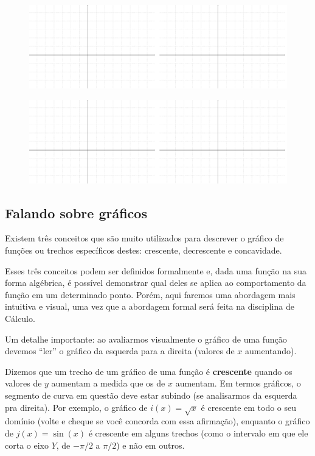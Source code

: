 \documentclass[main.tex]{subfiles}
\begin{document}
\begin{figure}[h]
\centering
\includegraphics[width=\textwidth]{./img/c7q1.png}
\end{figure}

\begin{figure}[h]
\centering
\includegraphics[width=\textwidth]{./img/c7q1.png}
\end{figure}

\newpage

\subsection*{Falando sobre gráficos}

Existem três conceitos que são muito utilizados para descrever o gráfico de funções ou trechos específicos destes: crescente, decrescente e concavidade.

Esses três conceitos podem ser definidos formalmente e, dada uma função na sua forma algébrica, é possível demonstrar qual deles se aplica ao comportamento da função em um determinado ponto. Porém, aqui faremos uma abordagem mais intuitiva e visual, uma vez que a abordagem formal será feita na disciplina de Cálculo.

Um detalhe importante: ao avaliarmos visualmente o gráfico de uma função devemos ``ler'' o gráfico da esquerda para a direita (valores de $x$ aumentando).

Dizemos que um trecho de um gráfico de uma função é \textbf{crescente} quando os valores de $y$ aumentam a medida que os de $x$ aumentam. Em termos gráficos, o segmento de curva em questão deve estar subindo (se analisarmos da esquerda pra direita). Por exemplo, o gráfico de $i(x)=\sqrt{x}$ é crescente em todo o seu domínio (volte e cheque se você concorda com essa afirmação), enquanto o gráfico de $j(x)=\sin(x)$ é crescente em alguns trechos (como o intervalo em que ele corta o eixo $Y$, de $-\pi/2$ a $\pi/2$) e não em outros.
\end{document}
